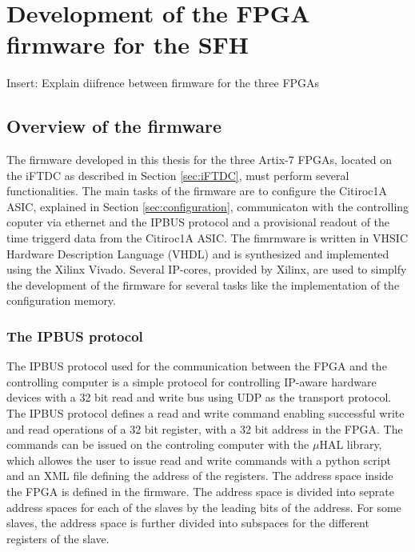 \chapter{Development of the FPGA firmware for the SFH}\label{cha:development}
Insert: Explain diifrence between firmware for the three FPGAs
\section{Overview of the firmware} 
The firmware developed in this thesis for the three Artix-7 FPGAs, located on the iFTDC as described in Section \ref{sec:iFTDC}, must perform several functionalities.
The main tasks of the firmware are to configure the Citiroc1A ASIC, explained in Section \ref{sec:configuration},
 communicaton with the controlling coputer via ethernet and the IPBUS protocol and a provisional readout of the time triggerd data from the Citiroc1A ASIC.
\newline
The fimrmware is written in VHSIC Hardware Description Language (VHDL) and is synthesized and implemented using the Xilinx Vivado.
Several IP-cores, provided by Xilinx, are used to simplfy the development of the firmware for several tasks like the implementation of the configuration memory.
\subsection{The IPBUS protocol}
The IPBUS protocol used for the communication between the FPGA and the controlling computer is a simple protocol for controlling IP-aware hardware devices with a 32 bit read and write bus using UDP as the transport protocol.\autocite{IPBUS_article}
\newline
The IPBUS protocol defines a read and write command enabling successful write and read operations of a 32 bit register, with a 32 bit address in the FPGA.    
\newline
The commands can be issued on the controling computer with the $\mu$HAL library, which allowes the user to issue read and write commands with a python script and an XML file defining the address of the registers.\autocite{IPBUS_article}
\newline
The address space inside the FPGA is defined in the firmware. The address space is divided into seprate address spaces for each of the slaves by the leading bits of the address.
For some slaves, the address space is further divided into subspaces for the different registers of the slave.


